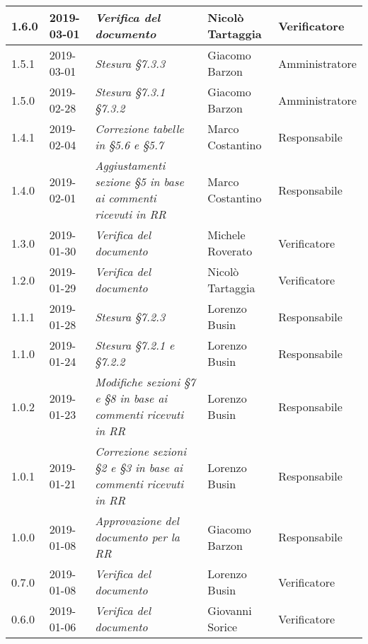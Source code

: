 \begin{longtable}{C{2cm}|C{2.5cm}|C{4.5cm}|C{2.5cm}|C{3cm}}
		1.6.0 & 2019-03-01 & \emph{Verifica del documento} & Nicolò Tartaggia & Verificatore \\
		\hline

		1.5.1 & 2019-03-01 & \emph{Stesura §7.3.3} & Giacomo Barzon & Amministratore \\
		\hline

		1.5.0 & 2019-02-28 & \emph{Stesura §7.3.1 §7.3.2} & Giacomo Barzon & Amministratore \\
		\hline

		1.4.1 & 2019-02-04 & \emph{Correzione tabelle in §5.6 e §5.7} & Marco Costantino & Responsabile \\
		\hline

		1.4.0 & 2019-02-01 & \emph{Aggiustamenti sezione §5 in base ai commenti ricevuti in RR} & Marco Costantino & Responsabile \\
		\hline

		1.3.0 & 2019-01-30 & \emph{Verifica del documento} & Michele Roverato & Verificatore \\
		\hline

		1.2.0 & 2019-01-29 & \emph{Verifica del documento} & Nicolò Tartaggia & Verificatore \\
		\hline

		1.1.1 & 2019-01-28 & \emph{Stesura §7.2.3} & Lorenzo Busin & Responsabile \\
		\hline

		1.1.0 & 2019-01-24 & \emph{Stesura §7.2.1 e §7.2.2} & Lorenzo Busin & Responsabile \\
		\hline

		1.0.2 & 2019-01-23 & \emph{Modifiche sezioni §7 e §8 in base ai commenti ricevuti in RR} & Lorenzo Busin & Responsabile \\
		\hline

		1.0.1 & 2019-01-21 & \emph{Correzione sezioni §2 e §3 in base ai commenti ricevuti in RR} & Lorenzo Busin & Responsabile \\
		\hline

		1.0.0 & 2019-01-08 & \emph{Approvazione del documento per la RR} & Giacomo Barzon & Responsabile \\
		\hline

		0.7.0 & 2019-01-08 & \emph{Verifica del documento} & Lorenzo Busin & Verificatore \\
		\hline

		0.6.0 & 2019-01-06 & \emph{Verifica del documento} & Giovanni Sorice & Verificatore \\
		\hline


\end{longtable}
